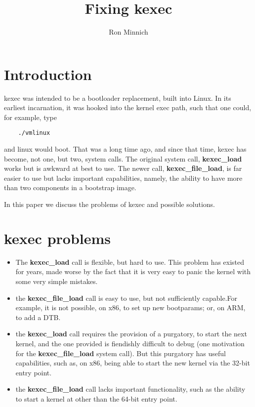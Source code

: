 \documentclass[fleqn,10pt]{olplainarticle}
\title{Fixing kexec}
\author[1]{Ron Minnich}
\affil[1]{Google}
\begin{document}
\flushbottom
\maketitle
\thispagestyle{empty}

\section*{Introduction}

kexec was intended to be a bootloader replacement, built into Linux. In its earliest incarnation, it was hooked into the kernel exec path, such that one could, for example, type
\begin{verbatim}
    ./vmlinux
\end{verbatim}
and linux would boot. That was a long time ago, and since that time, kexec has become, not one, but two, system calls.
The original system call, \textbf{kexec\_load} works but is awkward at best to use. 
The newer call, \textbf{kexec\_file\_load}, is far easier to use but lacks important capabilities, namely, the ability to have more than two
components in a bootstrap image.

In this paper we discuss the problems of kexec and possible solutions.
\section*{kexec problems}

\begin{itemize}
    \item The \textbf{kexec\_load}  call is flexible, but hard to use. This problem has existed for years, made worse by the fact that it is very easy to panic the kernel with some very simple mistakes.
    \item the \textbf{kexec\_file\_load} call is easy to use, but not sufficiently capable.For example, it is not possible, on x86, to set up new bootparams; or, on ARM, to add a DTB.
    \item the \textbf{kexec\_load}  call requires the provision of a purgatory, to start the next kernel, and the one provided is fiendishly difficult to debug (one motivation for the \textbf{kexec\_file\_load} system call). But this purgatory has useful capabilities, such as, on x86, being able to start the new kernel via the 32-bit entry point.
    \item the \textbf{kexec\_file\_load} call lacks important functionality, such as the ability to start a kernel at other than the 64-bit entry point.
\end{itemize}
\end{document}

